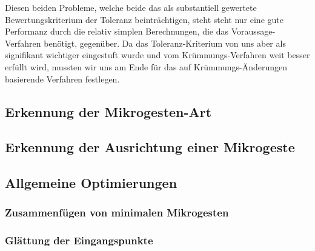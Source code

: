 Diesen beiden Probleme, welche beide das als substantiell gewertete Bewertungskriterium der Toleranz beinträchtigen, steht steht nur eine gute Performanz durch die relativ simplen Berechnungen, die das Voraussage-Verfahren benötigt, gegenüber. Da das Toleranz-Kriterium von uns aber als signifikant wichtiger eingestuft wurde und vom Krümmungs-Verfahren weit besser erfüllt wird, mussten wir uns am Ende für das auf Krümmungs-Änderungen basierende Verfahren festlegen.

\subsection{Erkennung der Mikrogesten-Art}


\subsection{Erkennung der Ausrichtung einer Mikrogeste}


\subsection{Allgemeine Optimierungen}


\subsubsection{Zusammenfügen von minimalen Mikrogesten}


\subsubsection{Glättung der Eingangspunkte}\label{sec:Glaettung}


